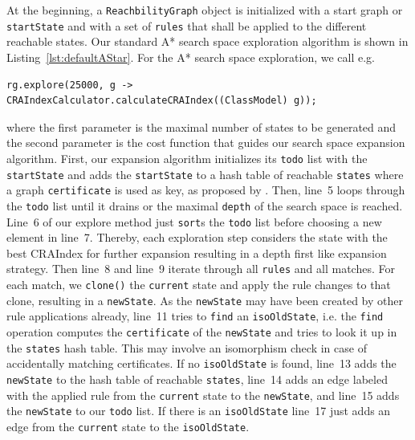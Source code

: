 \documentclass[submission,copyright,creativecommons]{eptcs}
\begin{document}
At the beginning, a \texttt{ReachbilityGraph} object is initialized with a 
start graph or \texttt{startState} and with a set of \texttt{rules} that 
shall be applied to the different reachable states. Our standard A* search space 
exploration algorithm is shown in 
Listing~\ref{lst:defaultAStar}. For the A* search space 
exploration, we call e.g.
\begin{verbatim}
rg.explore(25000, g -> CRAIndexCalculator.calculateCRAIndex((ClassModel) g));
\end{verbatim}
where the first parameter is the maximal number of 
states to be generated and the second parameter is the cost function that guides
our search space expansion algorithm. First, our expansion algorithm initializes 
its \texttt{todo} list with the \texttt{startState} and adds the 
\texttt{startState} to a hash table of reachable \texttt{states} where 
a graph \texttt{certificate} is used as key, as proposed by \cite{rensink2003groove}.
Then, line~5 loops through the \texttt{todo} list until it drains or the maximal 
\texttt{depth} of the search space is reached. 
Line~6 of our explore method just \texttt{sort}s the \texttt{todo} list before choosing 
a new element in line~7. Thereby, each exploration step considers the state with the best 
CRAIndex for further expansion resulting in a depth first like expansion strategy. 
Then line~8 and line~9 iterate through all \texttt{rules} and all matches. 
For each match, we \texttt{clone()} the \texttt{current} state and apply the 
rule changes to that clone, resulting in a \texttt{newState}. As the \texttt{newState}
may have been created by other rule applications already, line~11 tries to \texttt{find} 
an \texttt{isoOldState}, i.e. the \texttt{find}  operation computes the 
\texttt{certificate} of the \texttt{newState} and tries to look it up in the 
\texttt{states} hash table. This may involve an isomorphism check in case of accidentally 
matching certificates. If no \texttt{isoOldState} is found, line~13 adds the 
\texttt{newState} to the hash table of reachable \texttt{states}, line~14 adds an edge
labeled with the applied rule from the \texttt{current} state to the \texttt{newState}, 
and line~15 adds the \texttt{newState} to our \texttt{todo} list. If there is an 
\texttt{isoOldState} line~17 just adds an edge from the \texttt{current} state to the 
\texttt{isoOldState}.
\end{document}
